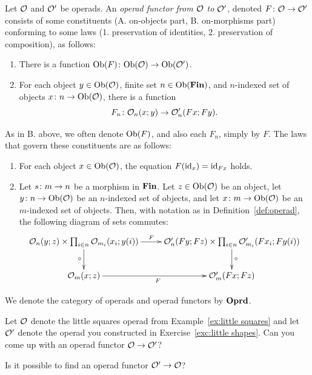 \documentclass[CT4S-EN-RU]{subfiles}
\begin{document}
\begin{warningRUS}
\end{warningRUS}

\begin{definitionENG}\label{def:operad morphism}
Let $\mathcal{O}$ and $\mathcal{O}'$ be operads. An {\em operad functor from $\mathcal{O}$ to $\mathcal{O}'$}, denoted $F\colon\mathcal{O}\rightarrow\mathcal{O}'$ consists of some constituents (A. on-objects part, B. on-morphisms part) conforming to some laws (1. preservation of identities, 2. preservation of composition), as follows:
\begin{enumerate}[\hsp A.]
\item There is a function $\textnormal{Ob}(F)\colon\textnormal{Ob}(\mathcal{O})\rightarrow\textnormal{Ob}(\mathcal{O}')$.
\item For each object $y\in\textnormal{Ob}(\mathcal{O})$, finite set $n\in\textnormal{Ob}({\mathbf{Fin}})$, and $n$-indexed set of objects $x\colon n\rightarrow\textnormal{Ob}(\mathcal{O})$, there is a function $$F_n\colon\mathcal{O}_n(x;y)\rightarrow\mathcal{O}'_n(Fx;Fy).$$
\end{enumerate}
As in B. above, we often denote $\textnormal{Ob}(F)$, and also each $F_n$, simply by $F$. The laws that govern these constituents are as follows:
\begin{enumerate}[\hsp 1.]
\item For each object $x\in\textnormal{Ob}(\mathcal{O})$, the equation $F(\textnormal{id}_x)=\textnormal{id}_{Fx}$ holds.
\item Let $s\colon m\rightarrow n$ be a morphism in ${\mathbf{Fin}}$. Let $z\in\textnormal{Ob}(\mathcal{O})$ be an object, let $y\colon n\rightarrow\textnormal{Ob}(\mathcal{O})$ be an $n$-indexed set of objects, and let $x\colon m\rightarrow\textnormal{Ob}(\mathcal{O})$ be an $m$-indexed set of objects. Then, with notation as in Definition~\ref{def:operad}, the following diagram of sets commutes:
\begin{align}\label{dia:operad functor on composition}
\xymatrix{
\mcO_n(y;z)\times\prod_{i\in n}\mcO_{m_i}(x_i;y(i))\ar[r]^-F\ar[d]_\circ&
\mcO'_n(Fy;Fz)\times\prod_{i\in n}\mcO'_{m_i}(Fx_i;Fy(i))\ar[d]^\circ\\
\mcO_m(x;z)\ar[r]_F&\mcO'_m(Fx;Fz)
}
\end{align}
\end{enumerate}

We denote the category of operads and operad functors by ${\mathbf{Oprd}}$.
\end{definitionENG}

\begin{definitionRUS}\label{def:operad morphism}
\end{definitionRUS}

\begin{exerciseENG}
Let $\mathcal{O}$ denote the little squares operad from Example~\ref{ex:little squares} and let $\mathcal{O}'$ denote the operad you constructed in Exercise~\ref{exc:little shapes}.
\sexc Can you come up with an operad functor $\mathcal{O}\rightarrow\mathcal{O}'$?
\item Is it possible to find an operad functor $\mathcal{O}'\rightarrow\mathcal{O}$? 
\endsexc
\end{exerciseENG}
\end{document}
